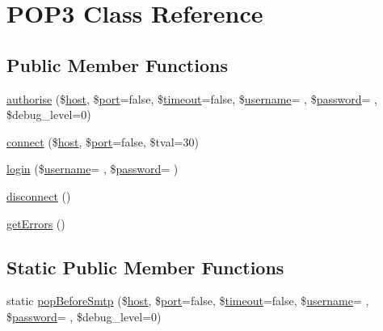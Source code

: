 \hypertarget{class_p_o_p3}{}\section{P\+O\+P3 Class Reference}
\label{class_p_o_p3}
\subsection*{Public Member Functions}
\begin{DoxyCompactItemize}
\item 
\hyperlink{class_p_o_p3_aa19e807272af0a5a99d51f4fb5cb5ebc}{authorise} (\$\hyperlink{ossn_8config_8db_8example_8php_a5bc8babfba069f855b3288f34a926b5a}{host}, \$\hyperlink{ossn_8config_8db_8example_8php_a6e0ca192d866e7f150aa770832456ae2}{port}=false, \$\hyperlink{jquery_8tokeninput_8js_a819aaeaa17cffb37ebc9c81d46edf048}{timeout}=false, \$\hyperlink{actions_2account_8php_ac9b3768ccc688c2ff0811c50c107a02e}{username}= \textquotesingle{}\textquotesingle{}, \$\hyperlink{actions_2account_8php_a3ef39d3ee8b2bcca6a288308549ccb44}{password}= \textquotesingle{}\textquotesingle{}, \$debug\+\_\+level=0)
\item 
\hyperlink{class_p_o_p3_aae9031598164fde5dd6d27bf9a35b813}{connect} (\$\hyperlink{ossn_8config_8db_8example_8php_a5bc8babfba069f855b3288f34a926b5a}{host}, \$\hyperlink{ossn_8config_8db_8example_8php_a6e0ca192d866e7f150aa770832456ae2}{port}=false, \$tval=30)
\item 
\hyperlink{class_p_o_p3_a6a62cec18394c970ae4f0ad5cd694ab1}{login} (\$\hyperlink{actions_2account_8php_ac9b3768ccc688c2ff0811c50c107a02e}{username}= \textquotesingle{}\textquotesingle{}, \$\hyperlink{actions_2account_8php_a3ef39d3ee8b2bcca6a288308549ccb44}{password}= \textquotesingle{}\textquotesingle{})
\item 
\hyperlink{class_p_o_p3_abe175fcf658475bc56e9d6fa02bc88ec}{disconnect} ()
\item 
\hyperlink{class_p_o_p3_a6e548ebf2656742bfd19939ead923ed2}{get\+Errors} ()
\end{DoxyCompactItemize}
\subsection*{Static Public Member Functions}
\begin{DoxyCompactItemize}
\item 
static \hyperlink{class_p_o_p3_acc5a1e66be51fdc1112dcb3e50711f10}{pop\+Before\+Smtp} (\$\hyperlink{ossn_8config_8db_8example_8php_a5bc8babfba069f855b3288f34a926b5a}{host}, \$\hyperlink{ossn_8config_8db_8example_8php_a6e0ca192d866e7f150aa770832456ae2}{port}=false, \$\hyperlink{jquery_8tokeninput_8js_a819aaeaa17cffb37ebc9c81d46edf048}{timeout}=false, \$\hyperlink{actions_2account_8php_ac9b3768ccc688c2ff0811c50c107a02e}{username}= \textquotesingle{}\textquotesingle{}, \$\hyperlink{actions_2account_8php_a3ef39d3ee8b2bcca6a288308549ccb44}{password}= \textquotesingle{}\textquotesingle{}, \$debug\+\_\+level=0)
\end{DoxyCompactItemize}
